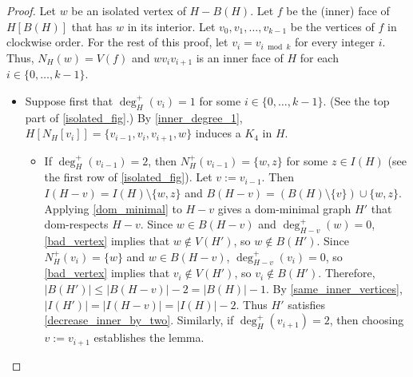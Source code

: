\documentclass{patmorin}
\begin{document}
\begin{proof}
Let $w$ be an isolated vertex of $H-B(H)$. Let $f$ be the (inner) face of $H[B(H)]$ that has $w$ in its interior. Let $v_0,v_1,\dots,v_{k-1}$ be the vertices of $f$ in clockwise order.  For the rest of this proof, let $v_{i}=v_{i\bmod k}$ for every integer $i$.  Thus, $N_H(w)=V(f)$ and $wv_iv_{i+1}$ is an inner face of $H$ for each $i\in\{0,\ldots,k-1\}$.

\begin{itemize}[leftmargin=*,label=$\bigstar$]
\item Suppose first that $\deg^+_H(v_i)=1$ for some $i\in\{0,\ldots,k-1\}$. (See the top part of \cref{isolated_fig}.) By \ref{inner_degree_1}, $H[N_H[v_i]]=\{v_{i-1},v_i,v_{i+1},w\}$ induces a $K_4$ in $H$.  
\begin{itemize}[leftmargin=*,label=]

\item If $\deg^+_{H}(v_{i-1})=2$, then $N^+_H(v_{i-1})=\{w,z\}$ for some $z\in I(H)$ (see the first row of \cref{isolated_fig}). Let $v:=v_{i-1}$. Then $I(H-v)=I(H)\setminus \{w,z\}$ and $B(H-v)=(B(H)\setminus \{v\})\cup \{w,z\}$.  Applying \cref{dom_minimal} to $H-v$ gives a dom-minimal graph $H'$ that dom-respects $H-v$.  Since $w\in B(H-v)$ and $\deg^+_{H-v}(w)=0$, \ref{bad_vertex} implies that $w\not\in V(H')$, so $w\not\in B(H')$.  Since $N^+_H(v_i)=\{w\}$ and $w\in B(H-v)$, $\deg^+_{H-v}(v_i)=0$, so \ref{bad_vertex} implies that $v_i\not\in V(H')$, so $v_i\not\in B(H')$.  Therefore, $|B(H')|\le |B(H-v)|-2= |B(H)|-1$.  By \ref{same_inner_vertices}, $|I(H')|=|I(H-v)|=|I(H)|-2$.  Thus $H'$ satisfies \ref{decrease_inner_by_two}.  Similarly, if $\deg^+_H(v_{i+1})=2$, then choosing $v:=v_{i+1}$ establishes the lemma.  


\end{itemize}
\end{itemize}
\end{proof}
\end{document}
